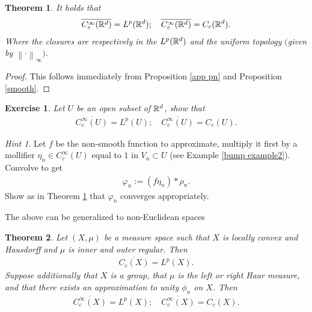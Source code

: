 \documentclass[12pt]{article}
\newtheorem{theorem}{Theorem}
\newtheorem{exercise}{Exercise}
\theoremstyle{remark}
\newtheorem*{hint}{Hint}
\renewcommand{\norm}[1]{\left\lVert #1 \right\rVert}\renewcommand{\abs}[1]{\left| #1 \right|}
\begin{document}
\begin{theorem}\label{density thm}It holds that
	\begin{align*}
		\overline{C_c^\infty(\mathbb{R}^d)}= L^p(\mathbb{R}^d); \quad \overline{C_c^\infty(\mathbb{R}^d)} = C_c(\mathbb{R}^d).
	\end{align*}
	Where the closures are respectively in the $L^p(\mathbb{R}^d)$ and the uniform topology $($given by $\norm{\cdot }_{\infty})$.
\end{theorem}
\begin{proof}
	This follows immediately from Proposition \ref{app pn} and Proposition \ref{smooth}.
\end{proof}
\begin{exercise}Let $U$ be an open subset of  $\mathbb{R}^d$, show that
	\begin{align*}
		\overline{C_c^\infty(U)}= L^p(U); \quad \overline{C_c^\infty(U)} = C_c(U).
	\end{align*}
\end{exercise}
\begin{hint}
	Let $f$ be the non-smooth function to approximate, multiply it first by a mollifier $\eta_n \in C_c^\infty(U)$ equal to $1$ in $ V_n\subset U$ (see Example \ref{bump example2}). Convolve to get
	\begin{align*}
		\varphi_n:=(f \eta_n )*\rho _n.
	\end{align*}
	Show as in Theorem \ref{density thm} that $\varphi_n$ converges appropriately.
\end{hint}
The above can be generalized to non-Euclidean spaces
\begin{theorem}
	Let $(X,\mu )$ be a measure space such that $X$ is locally convex and Hausdorff and  $\mu $ is inner and outer regular. Then
	\begin{align*}
		\overline{C_c(X)} =L^p(X).
	\end{align*}
	Suppose additionally that $X$ is a group, that $\mu $ is the left or right Haar measure, and that there exists an approximation to unity $\phi_n$ on $X$. Then
	\begin{align*}
		\overline{C_c^\infty(X)} =L^p(X);\quad \overline{C_c^\infty(X)} =C_c(X).
	\end{align*}
\end{theorem}
\end{document}

